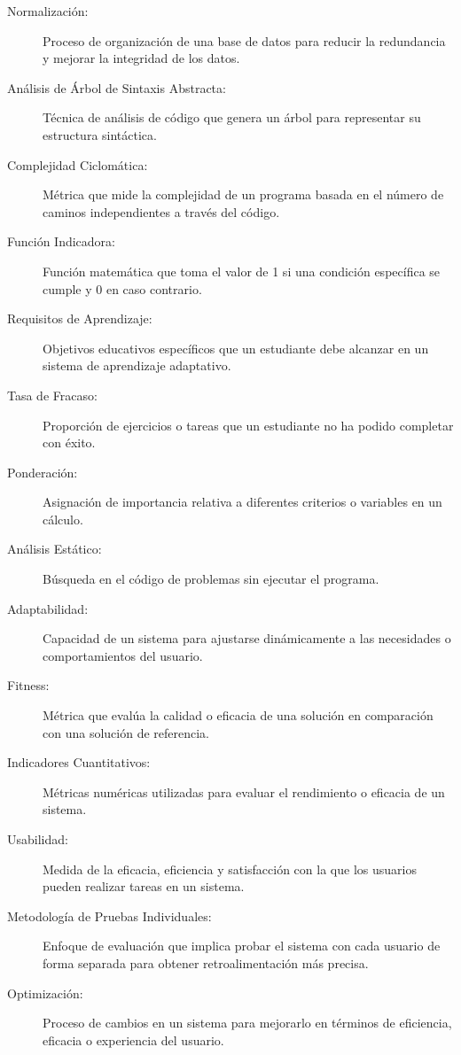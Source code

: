 \begin{description}
    \item[Normalización:] Proceso de organización de una base de datos para reducir la redundancia y mejorar la integridad de los datos.
    \item[Análisis de Árbol de Sintaxis Abstracta:] Técnica de análisis de código que genera un árbol para representar su estructura sintáctica.
    \item[Complejidad Ciclomática:] Métrica que mide la complejidad de un programa basada en el número de caminos independientes a través del código.
    \item[Función Indicadora:] Función matemática que toma el valor de 1 si una condición específica se cumple y 0 en caso contrario.
    \item[Requisitos de Aprendizaje:] Objetivos educativos específicos que un estudiante debe alcanzar en un sistema de aprendizaje adaptativo.
    \item[Tasa de Fracaso:] Proporción de ejercicios o tareas que un estudiante no ha podido completar con éxito.
    \item[Ponderación:] Asignación de importancia relativa a diferentes criterios o variables en un cálculo.
    \item[Análisis Estático:] Búsqueda en el código de problemas sin ejecutar el programa.
    \item[Adaptabilidad:] Capacidad de un sistema para ajustarse dinámicamente a las necesidades o comportamientos del usuario.
    \item[Fitness:] Métrica que evalúa la calidad o eficacia de una solución en comparación con una solución de referencia.
    \item[Indicadores Cuantitativos:] Métricas numéricas utilizadas para evaluar el rendimiento o eficacia de un sistema.
    \item[Usabilidad:] Medida de la eficacia, eficiencia y satisfacción con la que los usuarios pueden realizar tareas en un sistema.
    \item[Metodología de Pruebas Individuales:] Enfoque de evaluación que implica probar el sistema con cada usuario de forma separada para obtener retroalimentación más precisa.
    \item[Optimización:] Proceso de cambios en un sistema para mejorarlo en términos de eficiencia, eficacia o experiencia del usuario.
\end{description}
